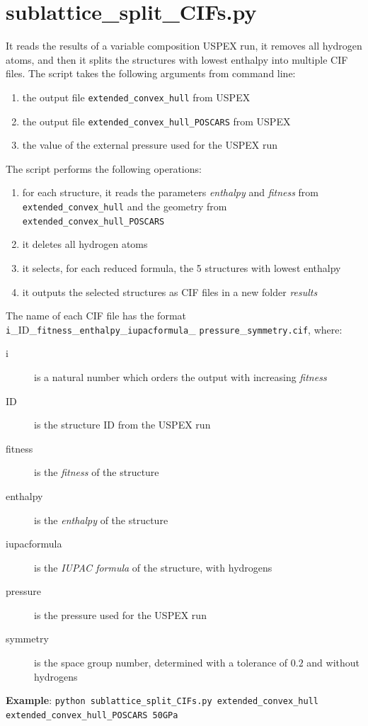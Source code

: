 \documentclass{article}
\begin{document}
\section{sublattice\_split\_CIFs.py}
It reads the results of a variable composition USPEX run, it removes all hydrogen atoms, and then it splits the structures with lowest enthalpy into multiple CIF files. The script takes the following arguments from command line:
\begin{enumerate}
	\item the output file \texttt{extended\_convex\_hull} from USPEX
	\item the output file \texttt{extended\_convex\_hull\_POSCARS} from USPEX
	\item the value of the external pressure used for the USPEX run
\end{enumerate}
The script performs the following operations:
\begin{enumerate}
	\item for each structure, it reads the parameters \emph{enthalpy} and \emph{fitness} from \texttt{extended\_convex\_hull} and the geometry from \texttt{extended\_convex\_hull\_POSCARS}
	\item it deletes all hydrogen atoms
	\item it selects, for each reduced formula, the 5 structures with lowest enthalpy
	\item it outputs the selected structures as CIF files in a new folder \textit{results}
\end{enumerate}
The name of each CIF file has the format \texttt{i}\_ID\_\texttt{fitness}\_\texttt{enthalpy}\_\texttt{iupacformula}\_ \texttt{pressure}\_\texttt{symmetry.cif}, where:
\begin{description}
	\item[i] is a natural number which orders the output with increasing \emph{fitness}
	\item[ID] is the structure ID from the USPEX run
	\item[fitness] is the \emph{fitness} of the structure
	\item[enthalpy] is the \emph{enthalpy} of the structure
	\item[iupacformula] is the \emph{IUPAC formula} of the structure, with hydrogens
	\item[pressure] is the pressure used for the USPEX run
	\item[symmetry] is the space group number, determined with a tolerance of $0.2$ and without hydrogens
\end{description}
\textbf{Example}: \texttt{python sublattice\_split\_CIFs.py extended\_convex\_hull \\ extended\_convex\_hull\_POSCARS 50GPa}
\end{document}
